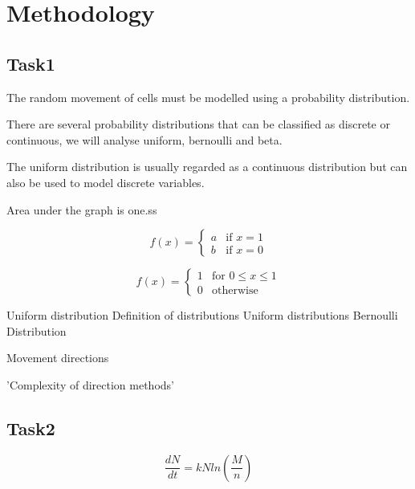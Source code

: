 \chapter{Methodology}

\section{Task1}

The random movement of cells must be modelled using a probability distribution.


There are several probability distributions that can be classified as discrete or continuous, we will analyse uniform, bernoulli and beta.

The uniform distribution is usually regarded as a continuous distribution but can also be used to model discrete variables. 

Area under the graph is one.ss

\[ f(x) =\begin{cases}a & \text{if } x = 1\\b & \text{if } x = 0\end{cases}\]

\[ f(x) =\begin{cases}1 & \text{for } 0  \leq x  \leq  1\\0 & \text{otherwise}\end{cases}\]

Uniform distribution
Definition of distributions
Uniform distributions
Bernoulli Distribution

Movement directions

'Complexity of direction methods'

\section{Task2}

\[ \frac{dN}{dt}  = kNln\left(\frac{M}{n} \right) \]
